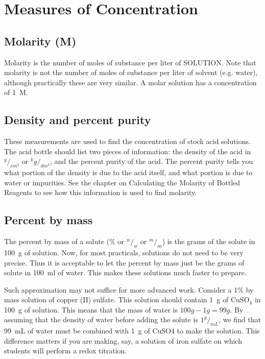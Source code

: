 \chapter{Measures of Concentration}

\section{Molarity (M)}

Molarity is the number of moles of substance per liter of SOLUTION. Note that molarity is not the number of moles of substance per liter of solvent (e.g. water), although practically these are very similar. A molar solution has a concentration of 1~M.

\section{Density and percent purity}

These measurements are used to find the concentration of stock acid solutions. The acid bottle should list two pieces of information: the density of the acid in $^g/_{cm^3}$ or $^kg/_{dm^3}$, and the percent purity of the acid. The percent purity tells you what portion of the density is due to the acid itself, and what portion is due to water or impurities. See the chapter on Calculating the Molarity of Bottled Reagents to see how this information is used to find molarity.

\section{Percent by mass}

The percent by mass of a solute (\% or $^w/_w$ or $^m/_m$) is the grams of the solute in 100~g of solution. Now, for most practicals, solutions do not need to be very precise. Thus it is acceptable to let the percent by mass just be the grams of solute in 100~ml of water. This makes these solutions much faster to prepare.

Such approximation may not suffice for more advanced work. Consider a 1\% by mass solution of copper (II) sulfate. This solution should contain 1~g of $\mathrm{CuSO}_4$ in 100~g of solution. This means that the mass of water is $100 g - 1 g = 99 g$. By assuming that the density of water before adding the solute is $1 ^g/_{mL}$, we find that 99~mL of water must be combined with 1~g of CuSO4 to make the solution. This difference matters if you are making, say, a solution of iron sulfate on which students will perform a redox titration. 

